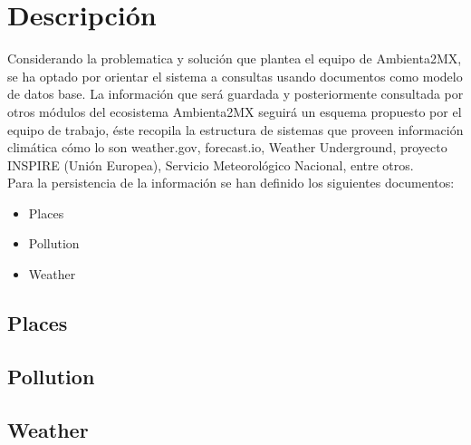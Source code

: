\section{Descripción}
Considerando la problematica y solución que plantea el equipo de Ambienta2MX, se ha optado por orientar el sistema a consultas usando documentos como modelo de datos base. La información que será guardada y posteriormente consultada por otros módulos del ecosistema Ambienta2MX seguirá un esquema propuesto por el equipo de trabajo, éste recopila la estructura de sistemas que proveen información climática cómo lo son weather.gov, forecast.io, Weather Underground, proyecto INSPIRE (Unión Europea), Servicio Meteorológico Nacional, entre otros. \cite{13} \cite{14} \cite{15}
\\
Para la persistencia de la información se han definido los siguientes documentos:   
\begin{itemize}
  \item Places
  \item Pollution
  \item Weather  
\end{itemize}

\newpage
\subsection{Places}
   
\newpage
\subsection{Pollution}
   
\newpage
\subsection{Weather}
   

